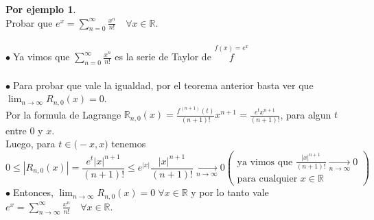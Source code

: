 \documentclass{article}
\theoremstyle{definition}
\theoremstyle{definition}
\newtheorem*{ej}{Por ejemplo}
\theoremstyle{remark}
\newcommand\R{\ensuremath{\mathbb{R}}}
\newcommand\bl{$\bullet\;$}
\begin{document}
\begin{ej} \; \\
  Probar que $e^x = \sum_{n=0}^{\infty}{\frac{x^n}{n!}}\quad \forall x \in \mathbb{R}$.\\\\
  \bl Ya vimos que $\sum_{n=0}^{\infty}{\frac{x^n}{n!}}$ es la serie de Taylor de $\overset{f(x)=e^x}{f}$ \\ \\
  \bl Para probar que vale la igualdad, por el teorema anterior basta ver que $\lim_{n\to\infty}{R_{n,0}(x)=0}$. \\
  Por la formula de Lagrange $\R_{n,0}(x)=\frac{f^{(n+1)}(t)}{(n+1)!}x^{n+1}=\frac{e^tx^{n+1}}{(n+1)!}$, para algun $t$ entre $0$ y $x$. \\
  Luego, para $t \in \big(-x,x\big)$ tenemos \[ 
    0 \leq |R_{n,0}(x)|=\frac{e^t|x|^{n+1}}{(n+1)!} \leq e^{|x|} \frac{|x|^{n+1}}{(n+1)!} \underset{n\to\infty}{\longrightarrow} 0 \left(\begin{array}{l}
        \text{ya vimos que }\frac{|x|^{n+1}}{(n+1)!} \underset{n\to\infty}{\longrightarrow} 0  \\
        \text{para cualquier } x \in \mathbb{R}
    \end{array}\right)
  \]
 \bl Entonces, $\lim_{n\to\infty}{R_{n,0}(x)=0} \; \forall x \in \mathbb{R}$ y por lo tanto vale $e^x=\sum_{n\to\infty}^{\infty}{\frac{x^n}{n!}} \quad \forall x \in \mathbb{R}$.

\end{ej}
\end{document}
